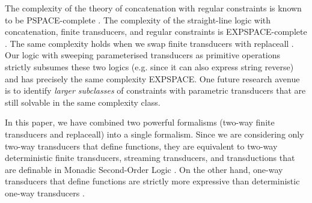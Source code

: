 The complexity of the theory of concatenation with regular constraints is
known to be PSPACE-complete \cite{Plandowski,J17}.
The complexity of the straight-line logic with concatenation, finite
transducers, and regular constraints is EXPSPACE-complete \cite{LB16}. The same 
complexity holds when we swap finite transducers with replaceall 
\cite{CCHLW18}. Our logic with sweeping parameterised transducers
as primitive operations strictly subsumes these two logics (e.g. since it can
also express string reverse) and has precisely the same complexity EXPSPACE.
One future research avenue is to identify \emph{larger subclasses} of
constraints with parametric transducers that are still solvable in the same 
complexity class.
%

In this paper, we have combined two powerful formalisms 
(two-way finite transducers and replaceall) into a single formalism. Since we 
are considering
only two-way transducers that define functions, they are equivalent to 
two-way deterministic finite transducers, streaming transducers, and
transductions that are definable in Monadic Second-Order Logic
\cite{EH01,AC10,AD11}. On the other hand, one-way transducers that define 
functions are strictly more expressive than deterministic one-way transducers
\cite{Berstel}. 

